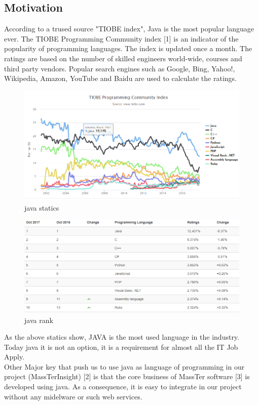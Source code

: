 \subsection{Motivation}
According to a trused source "TIOBE index", Java is the most popular language ever.
The TIOBE Programming Community index [1] is an indicator of the popularity of programming languages. The index is updated once a month. The ratings are based on the number of skilled engineers world-wide, courses and third party vendors. Popular search engines such as Google, Bing, Yahoo!, Wikipedia, Amazon, YouTube and Baidu are used to calculate the ratings.
	\begin{figure}[h]
	\centering
	\includegraphics[width=1.0\textwidth]{Java_statics.png}
	\caption{java statics}
    \end{figure}
	\begin{figure}[h]
	\centering
	\includegraphics[width=1.0\textwidth]{Java_rank.png}
	\caption{java rank}
    \end{figure}
 As the above statics show, JAVA is the most used language in the industry. Today java it is not an option, it is a requirement for almost all the IT Job Apply. \\Other Major key that push us to use java as language of programming in our project (MassTerInsight) [2] is that the core business of MassTer software [3] is developed using java. As a consequence, it is easy to integrate in our project without any midelware or such web services.
 
